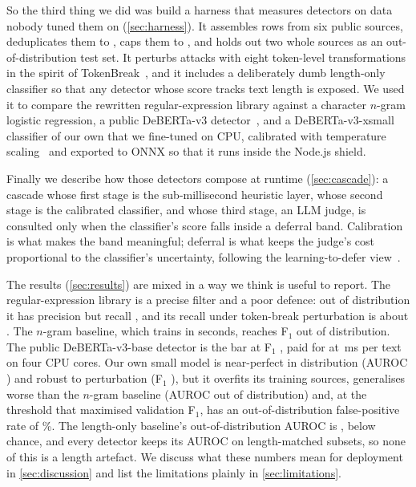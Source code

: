 \documentclass[10pt,a4paper]{article}
\newcommand{\ms}{\,ms}
\begin{document}
So the third thing we did was build a harness that measures detectors on data nobody tuned them on (\cref{sec:harness}). It assembles \nraw{} rows from six public sources, deduplicates them to \ndedupe{}, caps them to \ncaps{}, and holds out two whole sources as an out-of-distribution test set. It perturbs attacks with eight token-level transformations in the spirit of TokenBreak~\cite{schulz2025tokenbreak}, and it includes a deliberately dumb length-only classifier so that any detector whose score tracks text length is exposed. We used it to compare the rewritten regular-expression library against a character $n$-gram logistic regression, a public DeBERTa-v3 detector~\cite{protectai2024deberta}, and a DeBERTa-v3-xsmall classifier of our own that we fine-tuned on CPU, calibrated with temperature scaling~\cite{guo2017calibration} and exported to ONNX so that it runs inside the Node.js shield.

Finally we describe how those detectors compose at runtime (\cref{sec:cascade}): a cascade whose first stage is the sub-millisecond heuristic layer, whose second stage is the calibrated classifier, and whose third stage, an LLM judge, is consulted only when the classifier's score falls inside a deferral band. Calibration is what makes the band meaningful; deferral is what keeps the judge's cost proportional to the classifier's uncertainty, following the learning-to-defer view~\cite{madras2018predict,mozannar2020consistent}.

The results (\cref{sec:results}) are mixed in a way we think is useful to report. The regular-expression library is a precise filter and a poor defence: out of distribution it has precision \mregexmediumtestoodprecision{} but recall \mregexmediumtestoodrecall{}, and its recall under token-break perturbation is about \mpregexmediumtokenbreakspace. The $n$-gram baseline, which trains in seconds, reaches F$_1$ \mngramlrtestoodfone{} out of distribution. The public DeBERTa-v3-base detector is the bar at F$_1$ \mprotectaidebertavtwotestoodfone{}, paid for at \mprotectaidebertavtwotestoodlatency\ms{} per text on four CPU cores. Our own small model is near-perfect in distribution (AUROC \mevidentguardvzerotestauroc) and robust to perturbation (F$_1$ \mevidentguardvzerotestperturbedfone), but it overfits its training sources, generalises worse than the $n$-gram baseline (AUROC \mevidentguardvzerotestoodauroc{} out of distribution) and, at the threshold that maximised validation F$_1$, has an out-of-distribution false-positive rate of \mevidentguardvzerotestoodfprpct\%. The length-only baseline's out-of-distribution AUROC is \mlengthonlytestoodauroc{}, below chance, and every detector keeps its AUROC on length-matched subsets, so none of this is a length artefact. We discuss what these numbers mean for deployment in \cref{sec:discussion} and list the limitations plainly in \cref{sec:limitations}.
\end{document}
